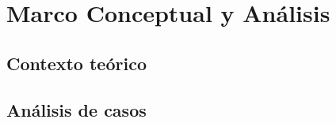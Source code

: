 
\section{Marco Conceptual y Análisis}

\lipsum[3-4]

\subsection{Contexto teórico}

\lipsum[5]


\subsection{Análisis de casos}

\lipsum[6]
